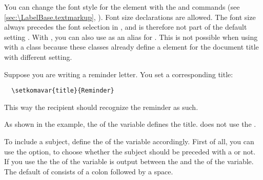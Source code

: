 %
%
You can change the font style for the
 element with
the  and
 commands (see
\autoref{sec:\LabelBase.textmarkup},
). Font size declarations are
allowed. The  font size always precedes the font selection in
\KOMAScript{}, and is therefore not part of the default setting
. With ,
you can also use  as an
alias for . This is not possible when using
 with a \KOMAScript{} class because these classes already
define a  element for the document title with different
setting.%
%
%
\begin{Example}
  Suppose you are writing a reminder letter. You set a corresponding title:
\begin{lstlisting}
  \setkomavar{title}{Reminder}
\end{lstlisting}
  This way the recipient should recognize the reminder as such.
\end{Example}
As shown in the example, the  of the variable defines the
title. \KOMAScript{} does not use the .%
%
\EndIndexGroup


\begin{Declaration}
\end{Declaration}
%
To include a subject, define the  of the 
variable accordingly. First of all, you can use the
 option,
to choose whether the subject should be preceded with a  or
not. If you use the  the  of the
 variable is output between the
 and the  of the 
variable. The default  of  consists of
a colon followed by a space.

